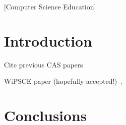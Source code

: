 \documentclass{sig-alternate}
\begin{document}
[Computer Science Education]


\section{Introduction}\label{intro}

Cite previous CAS papers~\cite{crick+sentance:2011,sentance-et-al-wipsce2012,brown-et-al-sigcse2012,brown-et-al-toce2014}

WiPSCE paper (hopefully accepted!)~\cite{crick+moller-wipsce2015}.

\section{Conclusions}\label{conclusions}




\end{document}
